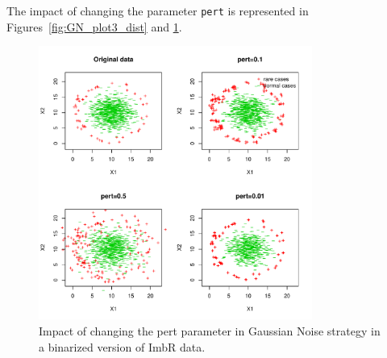 \documentclass[10pt,a4paper]{article}\usepackage[]{graphicx}\usepackage[]{color}
\newenvironment{knitrout}{}{} %
\begin{document}
The impact of changing the parameter \texttt{pert} is represented in Figures~\ref{fig:GN_plot3_dist} and \ref{fig:GN_plot3}.
\begin{knitrout}\footnotesize
{}\color{fgcolor}\begin{figure}

{\centering \includegraphics[width=0.8\textwidth]{figures/UBL-GN_plot3-1} 

}

\caption[Impact of changing the pert parameter in Gaussian Noise strategy in a binarized version of ImbR data]{Impact of changing the pert parameter in Gaussian Noise strategy in a binarized version of ImbR data.}\label{fig:GN_plot3}
\end{figure}


\end{knitrout}
\end{document}
